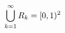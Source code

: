 \documentclass[preview]{standalone}
\begin{document}
\begin{align*}
\special{dvisvgm:raw <g id='unique000'>}\bigcup_{k=1}^\infty R_k=[0,1)^2\special{dvisvgm:raw </g>}
\end{align*}
\end{document}
